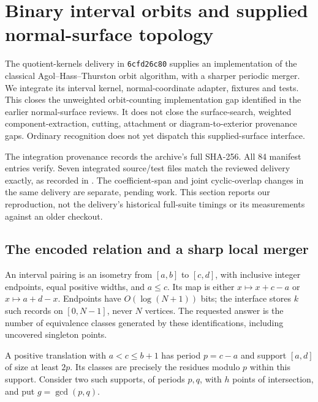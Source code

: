\section{Binary interval orbits and supplied normal-surface topology}
\label{sec:native-interval-orbits}

The quotient-kernels delivery in \texttt{6cfd26c80} supplies an implementation
of the classical Agol--Hass--Thurston orbit algorithm, with a sharper periodic
merger. We integrate its interval kernel, normal-coordinate adapter, fixtures
and tests. This closes the unweighted orbit-counting implementation gap
identified in the earlier normal-surface reviews. It does not close the
surface-search, weighted component-extraction, cutting, attachment or
diagram-to-exterior provenance gaps. Ordinary recognition does not yet
dispatch this supplied-surface interface.

The integration provenance records the archive's full SHA-256.
All 84 manifest entries verify.
Seven integrated source/test files match
the reviewed delivery exactly, as recorded in
. The coefficient-span and joint
cyclic-overlap changes in the same delivery are separate, pending work.
This section reports our reproduction, not the delivery's historical
full-suite timings or its measurements against an older checkout.

\subsection{The encoded relation and a sharp local merger}

An interval pairing is an isometry from $[a,b]$ to $[c,d]$, with inclusive
integer endpoints, equal positive widths, and $a\le c$. Its map is either
$x\mapsto x+c-a$ or $x\mapsto a+d-x$. Endpoints have $O(\log(N+1))$ bits;
the interface stores $k$ such records on $[0,N-1]$, never $N$ vertices.
The requested answer is the number of equivalence classes generated by
these identifications, including uncovered singleton points.

A positive translation with $a<c\le b+1$ has period $p=c-a$ and support
$[a,d]$ of size at least $2p$. Its classes are precisely the residues
modulo $p$ within this support. Consider two such supports, of periods
$p,q$, with $h$ points of intersection, and put $g=\gcd(p,q)$.

